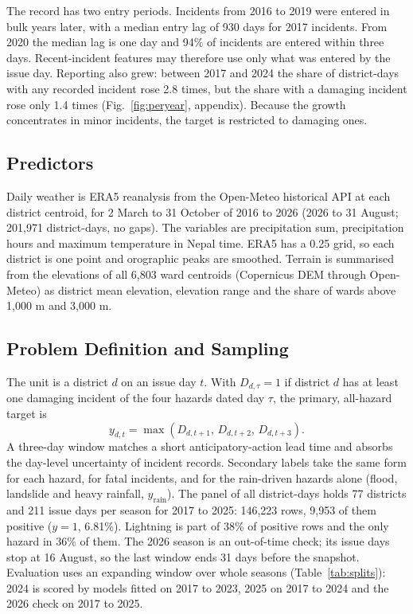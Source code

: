 \documentclass[conference]{IEEEtran}
\begin{document}
The record has two entry periods. Incidents from 2016 to 2019 were entered in bulk years later, with a median entry lag of 930 days for 2017 incidents. From 2020 the median lag is one day and 94\% of incidents are entered within three days. Recent-incident features may therefore use only what was entered by the issue day. Reporting also grew: between 2017 and 2024 the share of district-days with any recorded incident rose 2.8 times, but the share with a damaging incident rose only 1.4 times (Fig.~\ref{fig:peryear}, appendix). Because the growth concentrates in minor incidents, the target is restricted to damaging ones.

\subsection{Predictors}
Daily weather is ERA5 reanalysis \cite{Hersbach2020} from the Open-Meteo historical API \cite{Zippenfenig2023} at each district centroid, for 2 March to 31 October of 2016 to 2026 (2026 to 31 August; 201,971 district-days, no gaps). The variables are precipitation sum, precipitation hours and maximum temperature in Nepal time. ERA5 has a 0.25\textdegree{} grid, so each district is one point and orographic peaks are smoothed. Terrain is summarised from the elevations of all 6,803 ward centroids (Copernicus DEM through Open-Meteo) as district mean elevation, elevation range and the share of wards above 1,000 m and 3,000 m.

\subsection{Problem Definition and Sampling}
The unit is a district $d$ on an issue day $t$. With $D_{d,\tau}=1$ if district $d$ has at least one damaging incident of the four hazards dated day $\tau$, the primary, all-hazard target is
\begin{equation}
y_{d,t} = \max\left(D_{d,t+1},\, D_{d,t+2},\, D_{d,t+3}\right).
\label{eq:target}
\end{equation}
A three-day window matches a short anticipatory-action lead time and absorbs the day-level uncertainty of incident records. Secondary labels take the same form for each hazard, for fatal incidents, and for the rain-driven hazards alone (flood, landslide and heavy rainfall, $y_{\mathrm{rain}}$). The panel of all district-days holds 77 districts and 211 issue days per season for 2017 to 2025: 146,223 rows, 9,953 of them positive ($y=1$, 6.81\%). Lightning is part of 38\% of positive rows and the only hazard in 36\% of them. The 2026 season is an out-of-time check; its issue days stop at 16 August, so the last window ends 31 days before the snapshot. Evaluation uses an expanding window over whole seasons (Table~\ref{tab:splits}): 2024 is scored by models fitted on 2017 to 2023, 2025 on 2017 to 2024 and the 2026 check on 2017 to 2025.
\end{document}
